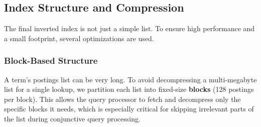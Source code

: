 \documentclass{article}
\begin{document}
\subsection{Index Structure and Compression}
The final inverted index is not just a simple list. To ensure high performance and a small footprint, several optimizations are used.

\subsubsection{Block-Based Structure}
A term's postings list can be very long. To avoid decompressing a multi-megabyte list for a single lookup, we partition each list into fixed-size \textbf{blocks} (128 postings per block). This allows the query processor to fetch and decompress only the specific blocks it needs, which is especially critical for skipping irrelevant parts of the list during conjunctive query processing.
\end{document}
